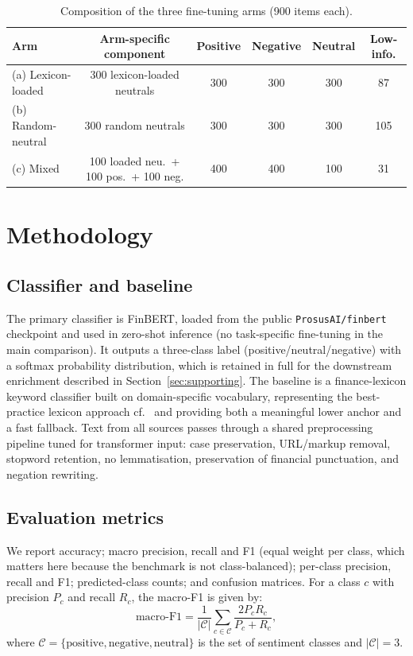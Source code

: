 \documentclass{aims}
\numberwithin{equation}{section}
\begin{document}
\begin{table}[ht]
\centering
\caption{Composition of the three fine-tuning arms (900 items each).}
\label{tab:arms}
\small
\begin{tabular}{lccccc}
\toprule
\textbf{Arm} & \textbf{Arm-specific component} & \textbf{Positive} & \textbf{Negative} & \textbf{Neutral} & \textbf{Low-info.} \\
\midrule
(a) Lexicon-loaded & 300 lexicon-loaded neutrals & 300 & 300 & 300 & 87 \\
(b) Random-neutral & 300 random neutrals & 300 & 300 & 300 & 105 \\
(c) Mixed & 100 loaded neu.\ + 100 pos.\ + 100 neg. & 400 & 400 & 100 & 31 \\
\bottomrule
\end{tabular}
\end{table}

\section{Methodology}\label{sec:method}
\subsection{Classifier and baseline}
The primary classifier is FinBERT, loaded from the public \texttt{ProsusAI/finbert}
checkpoint and used in zero-shot inference (no task-specific fine-tuning in the main
comparison). It outputs a three-class label (positive/neutral/negative) with a
softmax probability distribution, which is retained in full for the downstream
enrichment described in Section~\ref{sec:supporting}. The baseline is a
finance-lexicon keyword classifier built on domain-specific vocabulary,
representing the best-practice lexicon approach cf.~\citep{loughran2011} and
providing both a meaningful lower anchor and a fast fallback. Text from all sources
passes through a shared preprocessing pipeline tuned for transformer input: case
preservation, URL/markup removal, stopword retention, no lemmatisation, preservation
of financial punctuation, and negation rewriting.

\subsection{Evaluation metrics}
We report accuracy; macro precision, recall and F1 (equal weight per class, which
matters here because the benchmark is not class-balanced); per-class precision,
recall and F1; predicted-class counts; and confusion matrices. For a class $c$ with
precision $P_c$ and recall $R_c$, the macro-F1 is given by:
\begin{equation*}
\text{macro-F1} = \frac{1}{|\mathcal{C}|}\sum_{c\in\mathcal{C}}
\frac{2 P_c R_c}{P_c + R_c},
\end{equation*}
where $\mathcal{C} = \{\text{positive},\text{negative},\text{neutral}\}$ is the set
of sentiment classes and $|\mathcal{C}| = 3$.
\end{document}
